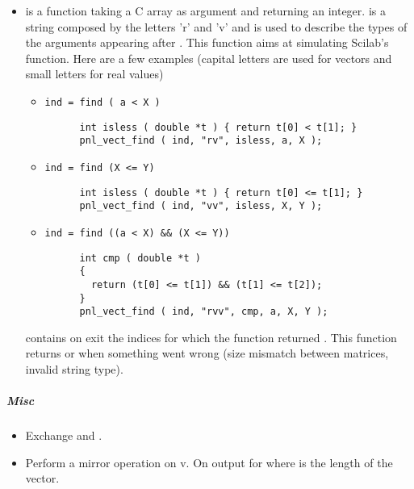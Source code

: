 \begin{itemize}
\item {}
  \sshortdescribe {} is a function taking a C array as argument and
  returning an integer.  is a string composed by the letters 'r' and
  'v' and is used to describe the types of the arguments appearing after .
  This function aims at simulating Scilab's 
  function. Here are a few examples (capital letters are used for vectors and
  small letters for real values)
  \begin{itemize}
    \item \verb!ind = find ( a < X )!
      \begin{verbatim}
      int isless ( double *t ) { return t[0] < t[1]; }
      pnl_vect_find ( ind, "rv", isless, a, X );
      \end{verbatim}
    \item \verb!ind = find (X <= Y)!
      \begin{verbatim}
      int isless ( double *t ) { return t[0] <= t[1]; }
      pnl_vect_find ( ind, "vv", isless, X, Y );
      \end{verbatim}
    \item \verb!ind = find ((a < X) && (X <= Y))!
      \begin{verbatim}
      int cmp ( double *t ) 
      { 
        return (t[0] <= t[1]) && (t[1] <= t[2]); 
      }
      pnl_vect_find ( ind, "rvv", cmp, a, X, Y );
      \end{verbatim}
  \end{itemize}
   contains on exit the indices  for which the function 
  returned . This function returns  or  when something
  went wrong (size mismatch between matrices, invalid string type).

\end{itemize}


\subparagraph{Misc}

\begin{itemize}
\item {}
  \sshortdescribe Exchange  and .
\item {}
  \sshortdescribe Perform a mirror operation on v. On output  for  where  is the length of the vector.
\end{itemize}


